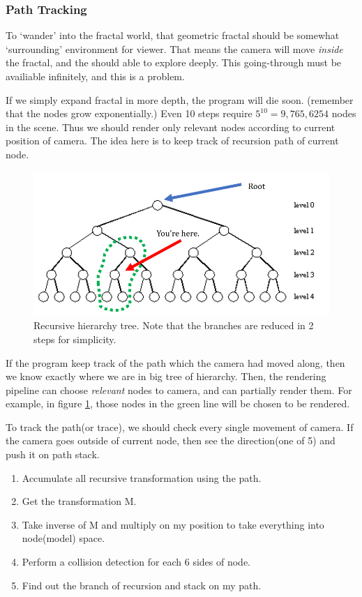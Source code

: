 \documentclass[a4paper]{article}
\begin{document}
\subsubsection{Path Tracking}\label{sssec:num1}
To `wander' into the fractal world, that geometric fractal should be somewhat `surrounding' environment for viewer.
That means the camera will move \textit{inside} the fractal, and the should able to explore deeply.
This going-through must be availiable infinitely, and this is a problem.

If we simply expand fractal in more depth, the program will die soon. (remember that the nodes grow exponentially.)
Even 10 steps require $5^{10}=9,765,6254$ nodes in the scene.
Thus we should render only relevant nodes according to current position of camera.
The idea here is to keep track of recursion path of current node.

\begin{figure}[H]
\centering
\includegraphics[scale=0.5]{tree.png}
\caption[q]{Recursive hierarchy tree. Note that the branches are reduced in 2 steps for simplicity.}
\label{fig:tree}
\end{figure}

If the program keep track of the path which the camera had moved along, then we know exactly where we are in big tree of hierarchy.
Then, the rendering pipeline can choose \textit{relevant} nodes to camera, and can partially render them.
For example, in figure \ref{fig:tree}, those nodes in the green line will be chosen to be rendered.

To track the path(or trace), we should check every single movement of camera.
If the camera goes outside of current node, then see the direction(one of 5) and push it on path stack.
\begin{enumerate}
  \item Accumulate all recursive transformation using the path.
  \item Get the transformation M.
  \item Take inverse of M and multiply on my position to take everything into node(model) space.
  \item Perform a collision detection for each 6 sides of node.
  \item Find out the branch of recursion and stack on my path.
\end{enumerate}
\end{document}

